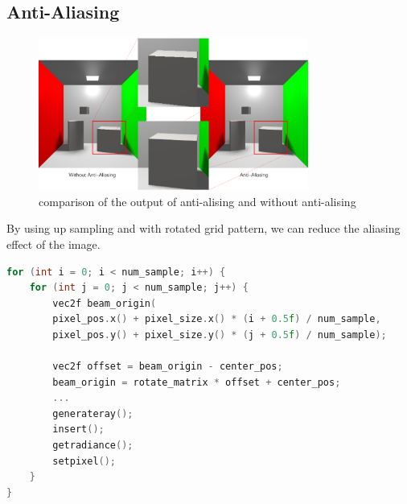 \documentclass[acmtog]{acmart}
\begin{document}
\subsection{Anti-Aliasing}
\begin{figure}[h]
	\centering
	\includegraphics[height = 5cm]{anti-aliasing.png}
	\caption{comparison of the output of anti-alising and without anti-alising}
\end{figure}
By using up sampling and with rotated grid pattern, we can reduce the aliasing effect of the image.

\begin{lstlisting}[language=C++]
for (int i = 0; i < num_sample; i++) {
	for (int j = 0; j < num_sample; j++) {
		vec2f beam_origin(
		pixel_pos.x() + pixel_size.x() * (i + 0.5f) / num_sample,
		pixel_pos.y() + pixel_size.y() * (j + 0.5f) / num_sample);

		vec2f offset = beam_origin - center_pos;
		beam_origin = rotate_matrix * offset + center_pos;
		...
		generateray();
		insert();
		getradiance();
		setpixel();
	}
}
\end{lstlisting}
\end{document}
